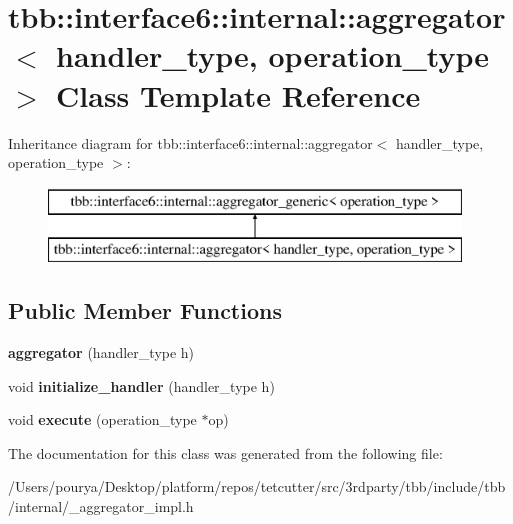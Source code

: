 \hypertarget{classtbb_1_1interface6_1_1internal_1_1aggregator}{}\section{tbb\+:\+:interface6\+:\+:internal\+:\+:aggregator$<$ handler\+\_\+type, operation\+\_\+type $>$ Class Template Reference}
\label{classtbb_1_1interface6_1_1internal_1_1aggregator}
Inheritance diagram for tbb\+:\+:interface6\+:\+:internal\+:\+:aggregator$<$ handler\+\_\+type, operation\+\_\+type $>$\+:\begin{figure}[H]
\begin{center}
\leavevmode
\includegraphics[height=2.000000cm]{classtbb_1_1interface6_1_1internal_1_1aggregator}
\end{center}
\end{figure}
\subsection*{Public Member Functions}
\begin{DoxyCompactItemize}
\item 
\hypertarget{classtbb_1_1interface6_1_1internal_1_1aggregator_a4ff74137dedbf73cc9ac8f7619f7a36e}{}{\bfseries aggregator} (handler\+\_\+type h)\label{classtbb_1_1interface6_1_1internal_1_1aggregator_a4ff74137dedbf73cc9ac8f7619f7a36e}

\item 
\hypertarget{classtbb_1_1interface6_1_1internal_1_1aggregator_a18ef49bd3b810927818f73b217dfd115}{}void {\bfseries initialize\+\_\+handler} (handler\+\_\+type h)\label{classtbb_1_1interface6_1_1internal_1_1aggregator_a18ef49bd3b810927818f73b217dfd115}

\item 
\hypertarget{classtbb_1_1interface6_1_1internal_1_1aggregator_af52e55d2c41ff608c8e1f8d6dc72fb43}{}void {\bfseries execute} (operation\+\_\+type $\ast$op)\label{classtbb_1_1interface6_1_1internal_1_1aggregator_af52e55d2c41ff608c8e1f8d6dc72fb43}

\end{DoxyCompactItemize}


The documentation for this class was generated from the following file\+:\begin{DoxyCompactItemize}
\item 
/\+Users/pourya/\+Desktop/platform/repos/tetcutter/src/3rdparty/tbb/include/tbb/internal/\+\_\+aggregator\+\_\+impl.\+h\end{DoxyCompactItemize}
